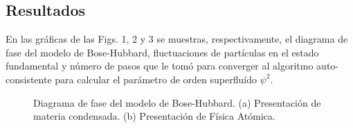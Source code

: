 \documentclass[11pt,letterpaper]{article}
\begin{document}
\subsection{Resultados}
En las gráficas de las Figs. 1, 2 y 3 se muestras, respectivamente, 
el diagrama de fase del modelo de Bose-Hubbard, fluctuaciones de partículas
en el estado fundamental y número de pasos que le tomó para converger 
al algoritmo auto-consistente para calcular el parámetro de orden 
superfluído $\psi ^2$.
\begin{figure}
\centering
{}
\caption{Diagrama de fase del modelo de Bose-Hubbard. (a) Presentación
de materia condensada. (b) Presentación de Física Atómica.}
\end{figure}
\end{document}

